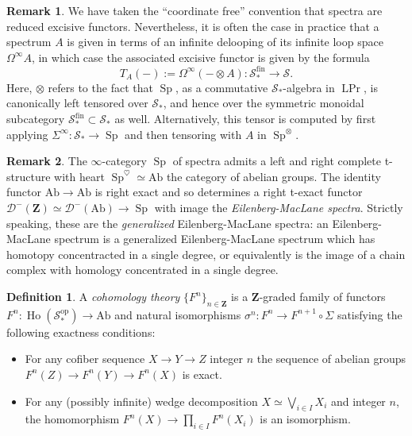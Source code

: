 \documentclass{article}
\renewcommand{\rm}{\mdseries}
\theoremstyle{definition}
\newtheorem{definition}{Definition}[subsection]
\newtheorem{remark}{Remark}[subsection]
\newcommand{\D}{\mathcal{D}}
\renewcommand{\S}{\mathcal{S}}
\newcommand{\ZZ}{\mathbf{Z}}
\newcommand{\too}{\longrightarrow}
\newcommand{\op}{\mathrm{op}}
\DeclareMathOperator{\Ho}{Ho}
\DeclareMathOperator{\Prl}{LPr}
\DeclareMathOperator{\Sp}{Sp}
\newcommand{\Ab}{\mathrm{Ab}}
\begin{document}
\begin{remark}
We have taken the ``coordinate free'' convention that spectra are reduced excisive functors.
Nevertheless, it is often the case in practice that a spectrum $A$ is given in terms of an infinite delooping of its infinite loop space $\Omega^\infty A$, in which case the associated excisive functor is given by the formula
\[
T_A(-):=\Omega^\infty(-\otimes A)\colon\S_*^\mathrm{fin}\too\S.
\]
Here, $\otimes$ refers to the fact that $\Sp$, as a commutative $\S_*$-algebra in $\Prl$, is canonically left tensored over $\S_*$, and hence over the symmetric monoidal subcategory $\S_*^\mathrm{fin}\subset\S_*$ as well. Alternatively, this tensor is computed by first applying $\Sigma^\infty:\S_*\to\Sp$ and then tensoring with $A$ in $\Sp^\otimes$.
\end{remark}



\begin{remark}
The $\infty$-category $\Sp$ of spectra admits a left and right complete t-structure with heart
$\Sp^\heartsuit\simeq\Ab$ the category of abelian groups.
The identity functor $\Ab\to\Ab$ is right exact and so determines a right t-exact functor $\D^-(\ZZ)\simeq\D^-(\Ab)\to\Sp$ with image the {\em Eilenberg-MacLane spectra}.
Strictly speaking, these are the {\em generalized} Eilenberg-MacLane spectra: an Eilenberg-MacLane spectrum is a generalized Eilenberg-MacLane spectrum which has homotopy concentracted in a single degree, or equivalently is the image of a chain complex with homology concentrated in a single degree.
\end{remark}


\begin{definition}
A {\em cohomology theory}
$\{F^n\}_{n\in\ZZ}$ is a $\ZZ$-graded family of functors $F^n:\Ho(\S_*^{\op})\to\Ab$ and natural isomorphisms $\sigma^n:F^n\to F^{n+1}\circ \Sigma$ satisfying the following exactness conditions:
\begin{itemize}\itemsep.1em
\item[\rm{(1)}]
For any cofiber sequence $X\to Y\to Z$ integer $n$ the sequence of abelian groups $F^n(Z)\to F^n(Y)\to F^n(X)$ is exact.
\item[\rm{(2)}]
For any (possibly infinite) wedge decomposition $X\simeq\bigvee_{i\in I} X_i$ and integer $n$, the homomorphism $F^n(X)\to\prod_{i\in I} F^n(X_i)$ is an isomorphism.
\end{itemize}
\end{definition}
\end{document}
